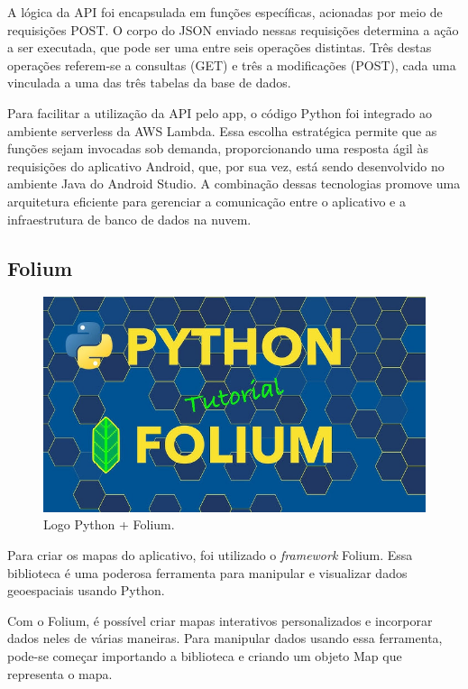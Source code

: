     A lógica da API foi encapsulada em funções específicas, acionadas por meio de requisições POST. O corpo do JSON enviado nessas requisições determina a ação a ser executada, que pode ser uma entre seis operações distintas. Três destas operações referem-se a consultas (GET) e três a modificações (POST), cada uma vinculada a uma das três tabelas da base de dados.

    Para facilitar a utilização da API pelo app, o código Python foi integrado ao ambiente serverless da AWS Lambda. Essa escolha estratégica permite que as funções sejam invocadas sob demanda, proporcionando uma resposta ágil às requisições do aplicativo Android, que, por sua vez, está sendo desenvolvido no ambiente Java do Android Studio. A combinação dessas tecnologias promove uma arquitetura eficiente para gerenciar a comunicação entre o aplicativo e a infraestrutura de banco de dados na nuvem.

    \subsection{Folium}

    \begin{figure}[hp]
    \centering
    
    \includegraphics[scale=0.1]{figures/python_folium.jpg}
    
    \caption{Logo Python + Folium.}
\end{figure}

 Para criar os mapas do aplicativo, foi utilizado o \textit{framework} Folium. Essa biblioteca é uma poderosa ferramenta para manipular e visualizar dados geoespaciais usando Python. 
    
    Com o Folium, é possível criar mapas interativos personalizados e incorporar dados neles de várias maneiras. Para manipular dados usando essa ferramenta, pode-se começar importando a biblioteca e criando um objeto Map que representa o mapa. 
    
